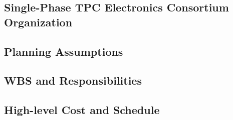 \subsection{Single-Phase TPC Electronics Consortium Organization}
\label{sec:fdsp-tpc-elec-org-consortium}


\subsection{Planning Assumptions}
\label{sec:fdsp-tpc-elec-org-assmp}


\subsection{WBS and Responsibilities}
\label{sec:fdsp-tpc-elec-org-wbs}

\subsection{High-level Cost and Schedule}
\label{sec:fdsp-tpc-elec-org-cs}














